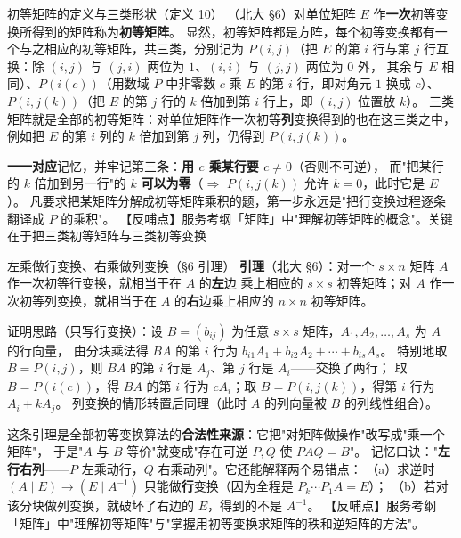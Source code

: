 
\begin{fdeep}{初等矩阵的定义与三类形状（定义 10）}
（北大 §6）对单位矩阵 $E$ 作\textbf{一次}初等变换所得到的矩阵称为\textbf{初等矩阵}。
显然，初等矩阵都是方阵，每个初等变换都有一个与之相应的初等矩阵，共三类，分别记为
$P(i,j)$（把 $E$ 的第 $i$ 行与第 $j$ 行互换：除 $(i,j)$ 与 $(j,i)$ 两位为 $1$、$(i,i)$ 与 $(j,j)$ 两位为 $0$ 外，
其余与 $E$ 相同）、$P(i(c))$（用数域 $P$ 中非零数 $c$ 乘 $E$ 的第 $i$ 行，即对角元 $1$ 换成 $c$）、
$P(i,j(k))$（把 $E$ 的第 $j$ 行的 $k$ 倍加到第 $i$ 行上，即 $(i,j)$ 位置放 $k$）。
三类矩阵就是全部的初等矩阵：对单位矩阵作一次初等\textbf{列}变换得到的也在这三类之中，
例如把 $E$ 的第 $i$ 列的 $k$ 倍加到第 $j$ 列，仍得到 $P(i,j(k))$。

\textbf{一一对应}记忆，并牢记第三条：\textbf{用 $c$ 乘某行要 $c\ne0$}（否则不可逆），
而"把某行的 $k$ 倍加到另一行"的 $k$ \textbf{可以为零}（$\Rightarrow$ $P(i,j(k))$ 允许 $k=0$，此时它是 $E$）。
凡要求把某矩阵分解成初等矩阵乘积的题，第一步永远是"把行变换过程逐条翻译成 $P$ 的乘积"。
【反哺点】服务考纲「矩阵」中"理解初等矩阵的概念"。关键在于把三类初等矩阵与三类初等变换
\end{fdeep}

\begin{fdeep}{左乘做行变换、右乘做列变换（§6 引理）}
\textbf{引理}（北大 §6）：对一个 $s\times n$ 矩阵 $A$ 作一次初等行变换，就相当于在 $A$ 的\textbf{左}边
乘上相应的 $s\times s$ 初等矩阵；对 $A$ 作一次初等列变换，就相当于在 $A$ 的\textbf{右}边乘上相应的
$n\times n$ 初等矩阵。

证明思路（只写行变换）：设 $B=(b_{ij})$ 为任意 $s\times s$ 矩阵，$A_1,A_2,\dots,A_s$ 为 $A$ 的行向量，
由分块乘法得 $BA$ 的第 $i$ 行为 $b_{i1}A_1+b_{i2}A_2+\cdots+b_{is}A_s$。
特别地取 $B=P(i,j)$，则 $BA$ 的第 $i$ 行是 $A_j$、第 $j$ 行是 $A_i$——交换了两行；
取 $B=P(i(c))$，得 $BA$ 的第 $i$ 行为 $cA_i$；取 $B=P(i,j(k))$，得第 $i$ 行为 $A_i+kA_j$。
列变换的情形转置后同理（此时 $A$ 的列向量被 $B$ 的列线性组合）。

这条引理是全部初等变换算法的\textbf{合法性来源}：它把"对矩阵做操作"改写成"乘一个矩阵"，
于是"$A$ 与 $B$ 等价"就变成"存在可逆 $P,Q$ 使 $PAQ=B$"。
记忆口诀："\textbf{左行右列}——$P$ 左乘动行，$Q$ 右乘动列"。它还能解释两个易错点：
（a）求逆时 $(A\mid E)\to(E\mid A^{-1})$ 只能做\textbf{行}变换（因为全程是 $P_k\cdots P_1A=E$）；
（b）若对该分块做列变换，就破坏了右边的 $E$，得到的不是 $A^{-1}$。
【反哺点】服务考纲「矩阵」中"理解初等矩阵"与"掌握用初等变换求矩阵的秩和逆矩阵的方法"。
\end{fdeep}


